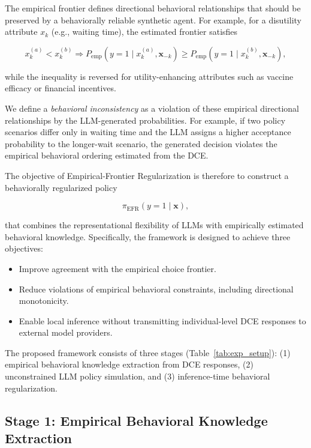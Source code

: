 \documentclass[11pt]{article}
\begin{document}
The empirical frontier defines directional behavioral relationships that should be preserved by a behaviorally reliable synthetic agent. For example, for a disutility attribute $x_k$ (e.g., waiting time), the estimated frontier satisfies

\begin{equation}
x_k^{(a)}<x_k^{(b)}
\Longrightarrow
P_{\mathrm{emp}}(y=1\mid x_k^{(a)},\mathbf{x}_{-k})
\ge
P_{\mathrm{emp}}(y=1\mid x_k^{(b)},\mathbf{x}_{-k}),
\label{eq:monotonicity}
\end{equation}

while the inequality is reversed for utility-enhancing attributes such as vaccine efficacy or financial incentives.

We define a \textit{behavioral inconsistency} as a violation of these empirical directional relationships by the LLM-generated probabilities. For example, if two policy scenarios differ only in waiting time and the LLM assigns a higher acceptance probability to the longer-wait scenario, the generated decision violates the empirical behavioral ordering estimated from the DCE.

The objective of Empirical-Frontier Regularization is therefore to construct a behaviorally regularized policy

\[
\pi_{\mathrm{EFR}}(y=1\mid\mathbf{x}),
\]

that combines the representational flexibility of LLMs with empirically estimated behavioral knowledge. Specifically, the framework is designed to achieve three objectives:

\begin{itemize}
\item[(O1)] Improve agreement with the empirical choice frontier.
\item[(O2)] Reduce violations of empirical behavioral constraints, including directional monotonicity.
\item[(O3)] Enable local inference without transmitting individual-level DCE responses to external model providers.
\end{itemize}

The proposed framework consists of three stages (Table~\ref{tab:exp_setup}): (1) empirical behavioral knowledge extraction from DCE responses, (2) unconstrained LLM policy simulation, and (3) inference-time behavioral regularization.

\subsection{Stage 1: Empirical Behavioral Knowledge Extraction}
\label{sec:stage1}
\end{document}
